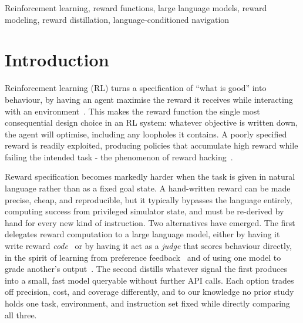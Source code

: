 \documentclass[conference]{IEEEtran}
\begin{document}
\begin{IEEEkeywords}
Reinforcement learning, reward functions, large language models, reward modeling, reward distillation, language-conditioned navigation
\end{IEEEkeywords}

\section{Introduction}
\label{sec:intro}

Reinforcement learning (RL) turns a specification of ``what is good''
into behaviour, by having an agent maximise the reward it receives while
interacting with an environment~\cite{sutton2018rl}. This makes the
reward function the single most consequential design choice in an RL
system: whatever objective is written down, the agent will optimise,
including any loopholes it contains. A poorly specified reward is
readily exploited, producing policies that accumulate high reward while
failing the intended task - the phenomenon of reward
hacking~\cite{amodei2016concrete}.

Reward specification becomes markedly harder when the task is given in
natural language rather than as a fixed goal state. A hand-written
reward can be made precise, cheap, and reproducible, but it typically
bypasses the language entirely, computing success from privileged
simulator state, and must be re-derived by hand for every new kind of
instruction. Two alternatives have emerged. The first delegates reward
computation to a large language model, either by having it write reward
\emph{code}~\cite{ma2024eureka,xie2024text2reward} or by having it act
as a \emph{judge} that scores behaviour directly, in the spirit of
learning from preference feedback~\cite{christiano2017rlhf} and of
using one model to grade another's output~\cite{zheng2023judging}. The
second distills whatever signal the first produces into a small, fast
model queryable without further API calls. Each option trades off
precision, cost, and coverage differently, and to our knowledge no prior
study holds one task, environment, and instruction set fixed while
directly comparing all three.
\end{document}
